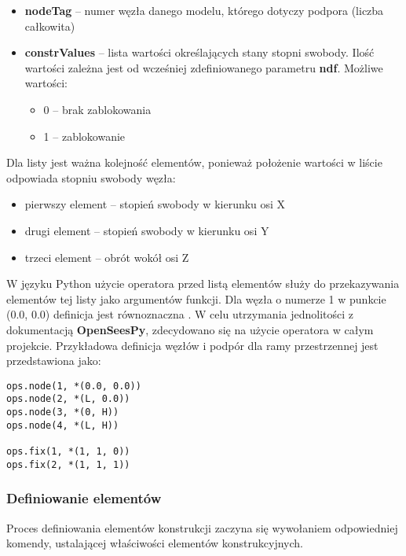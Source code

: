 \begin{itemize}
    \item \textbf{nodeTag} – numer węzła danego modelu, którego dotyczy podpora (liczba całkowita)
    \item \textbf{constrValues} – lista wartości określających stany stopni swobody. Ilość wartości zależna jest od wcześniej zdefiniowanego parametru \textbf{ndf}. Możliwe wartości:
    \begin{itemize}
        \item 0 – brak zablokowania
        \item 1 – zablokowanie
    \end{itemize}
\end{itemize}

Dla listy  jest ważna kolejność elementów, ponieważ położenie wartości w liście odpowiada stopniu swobody węzła:
\begin{itemize}
    \item pierwszy element – stopień swobody w kierunku osi X
    \item drugi element – stopień swobody w kierunku osi Y
    \item trzeci element – obrót wokół osi Z
\end{itemize}

W języku Python użycie operatora \inlinecode{*} przed listą elementów służy do przekazywania elementów tej listy jako argumentów funkcji.
Dla węzła o numerze 1 w punkcie (0.0, 0.0) definicja  jest równoznaczna .
W celu utrzymania jednolitości z dokumentacją \textbf{OpenSeesPy}, zdecydowano się na użycie operatora \inlinecode{*} w całym projekcie.
Przykładowa definicja węzłów i podpór dla ramy przestrzennej jest przedstawiona jako:

\begin{lstlisting}
ops.node(1, *(0.0, 0.0))
ops.node(2, *(L, 0.0))
ops.node(3, *(0, H))
ops.node(4, *(L, H))

ops.fix(1, *(1, 1, 0))
ops.fix(2, *(1, 1, 1))
\end{lstlisting}

\subsubsection{Definiowanie elementów}

Proces definiowania elementów konstrukcji zaczyna się wywołaniem odpowiedniej komendy, ustalającej właściwości elementów konstrukcyjnych.


